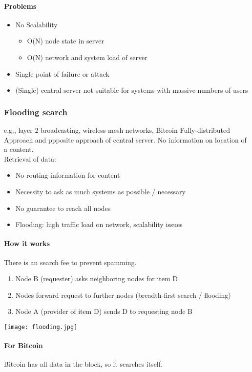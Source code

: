 \paragraph{Problems}
\begin{itemize}
  \item No Scalability
  \begin{itemize}
    \item O(N) node state in server
    \item O(N) network and system load of server
  \end{itemize}
  \item Single point of failure or attack
  \item (Single) central server not suitable for systems with massive numbers of users
\end{itemize}


\subsubsection{Flooding search}
e.g., layer 2 broadcasting, wireless mesh networks, Bitcoin
Fully-distributed Approach and ppposite approach of central server. No information on location of a content.\\
Retrieval of data:
\begin{itemize}
  \item No routing information for content
  \item Necessity to ask as much systems as possible / necessary
  \item No guarantee to reach all nodes
  \item Flooding: high traffic load on network, scalability issues
\end{itemize}

\paragraph{How it works}
There is an search fee to prevent spamming.
\begin{enumerate}
  \item Node B (requester) asks neighboring nodes for item D
  \item  Nodes forward request to further nodes (breadth-first search / flooding)
  \item Node A (provider of item D) sends D to requesting node B
\end{enumerate}
\texttt{[image: flooding.jpg]}
\paragraph{For Bitcoin}
Bitcoin has all data in the block, so it searches itself.

